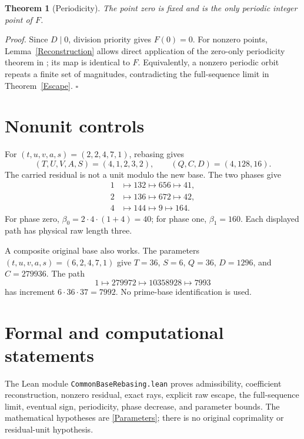 \documentclass[11pt,letterpaper]{article}
\newtheorem{theorem}{Theorem}
\newenvironment{proof}{\noindent\textit{Proof.}}{\hfill\(\square\)}
\begin{document}
\begin{theorem}[Periodicity]\label{Periodic}
The point zero is fixed and is the only periodic integer point of \(F\).
\end{theorem}

\begin{proof}
Since \(D\mid0\), division priority gives \(F(0)=0\). For nonzero points,
Lemma~\ref{Reconstruction} allows direct application of the zero-only
periodicity theorem in \cite{AscendCommonBase}; its map is identical to \(F\).
Equivalently, a nonzero periodic orbit repeats a finite set of magnitudes,
contradicting the full-sequence limit in Theorem~\ref{Escape}.
\end{proof}

\section{Nonunit controls}

For \((t,u,v,a,s)=(2,2,4,7,1)\), rebasing gives
\[
(T,U,V,A,S)=(4,1,2,3,2),\qquad (Q,C,D)=(4,128,16).
\]
The carried residual is not a unit modulo the new base. The two phases give
\[
\begin{aligned}
1&\longmapsto132\longmapsto656\longmapsto41,\\
2&\longmapsto136\longmapsto672\longmapsto42,\\
4&\longmapsto144\longmapsto9\longmapsto164.
\end{aligned}
\]
For phase zero, \(\beta_0=2\cdot4\cdot(1+4)=40\); for phase one,
\(\beta_1=160\). Each displayed path has physical raw length three.

A composite original base also works. The parameters
\((t,u,v,a,s)=(6,2,4,7,1)\) give \(T=36\), \(S=6\),
\(Q=36\), \(D=1296\), and \(C=279936\). The path
\[
1\longmapsto279972\longmapsto10358928\longmapsto7993
\]
has increment \(6\cdot36\cdot37=7992\). No prime-base identification is used.

\section{Formal and computational statements}

The Lean module \texttt{CommonBaseRebasing.lean} proves admissibility,
coefficient reconstruction, nonzero residual, exact rays, explicit raw
escape, the full-sequence limit, eventual sign, periodicity, phase decrease,
and parameter bounds. The mathematical hypotheses are \eqref{Parameters};
there is no original coprimality or residual-unit hypothesis.
\end{document}
